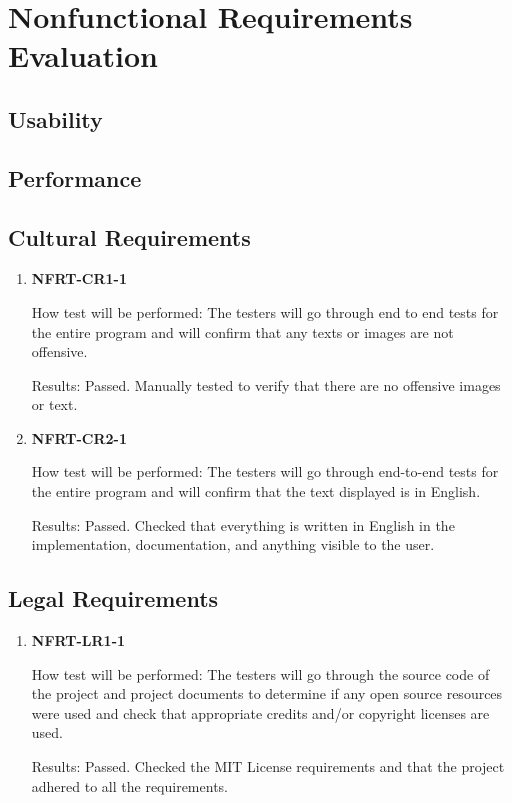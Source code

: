 \documentclass[12pt, titlepage]{article}
\begin{document}
\section{Nonfunctional Requirements Evaluation}

\subsection{Usability}

\subsection{Performance}

\subsection{Cultural Requirements}
\begin{enumerate}
	\item \textbf{NFRT-CR1-1}

	      How test will be performed: The testers will go through end to end tests for the entire program and
	      will confirm that any texts or images are not offensive.

	      Results: Passed. Manually tested to verify that there are no offensive images or text.

	\item \textbf{NFRT-CR2-1}

	      How test will be performed: The testers will go through end-to-end tests for the entire program and
	      will confirm that the text displayed is in English.

	      Results: Passed. Checked that everything is written in English in the implementation,
	      documentation, and anything visible to the user.

\end{enumerate}

\subsection{Legal Requirements}
\begin{enumerate}
	\item \textbf{NFRT-LR1-1}

	      How test will be performed: The testers will go through the source code of the project and project
	      documents to determine if any open source resources were used and check that appropriate credits
	      and/or copyright licenses are used.

	      Results: Passed. Checked the MIT License requirements and that the project adhered to all the
	      requirements.

\end{enumerate}
\end{document}
